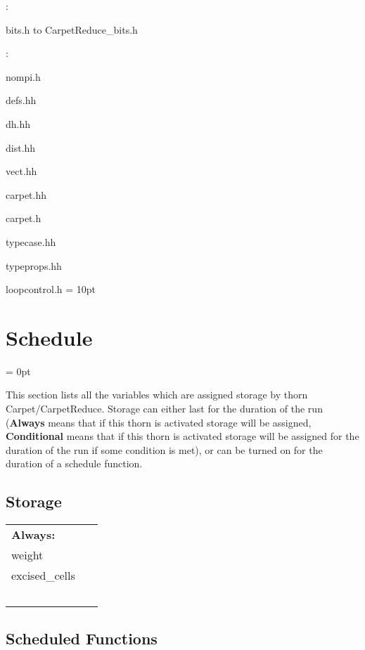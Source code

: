 \vspace{5mm}

: 



bits.h to CarpetReduce\_bits.h
\vspace{2mm}

: 

nompi.h

defs.hh

dh.hh

dist.hh

vect.hh

carpet.hh

carpet.h

typecase.hh

typeprops.hh

loopcontrol.h
\vspace{2mm}\parskip = 10pt 

\section{Schedule} 


\parskip = 0pt


\noindent This section lists all the variables which are assigned storage by thorn Carpet/CarpetReduce.  Storage can either last for the duration of the run ({\bf Always} means that if this thorn is activated storage will be assigned, {\bf Conditional} means that if this thorn is activated storage will be assigned for the duration of the run if some condition is met), or can be turned on for the duration of a schedule function.


\subsection*{Storage}

\hspace{5mm}

 \begin{tabular*}{160mm}{ll} 

{\bf Always:}&  ~ \\ 
 weight & ~\\ 
 excised\_cells & ~\\ 
~ & ~\\ 
\end{tabular*} 


\subsection*{Scheduled Functions}
\vspace{5mm}


